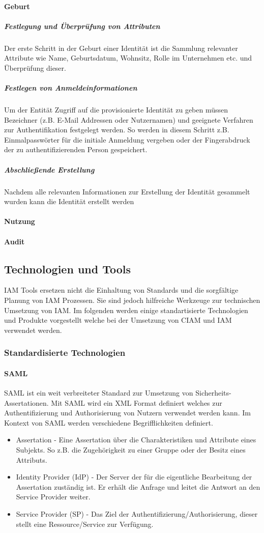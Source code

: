 \documentclass[10pt]{article}
\begin{document}
\paragraph{Geburt}
\subparagraph{Festlegung und Überprüfung von Attributen}
Der erste Schritt in der Geburt einer Identität ist die Sammlung relevanter Attribute wie Name, Geburtsdatum, Wohnsitz, Rolle im Unternehmen etc. und Überprüfung dieser.
\subparagraph{Festlegen von Anmeldeinformationen}
Um der Entität Zugriff auf die provisionierte Identität zu geben müssen Bezeichner (z.B. E-Mail Addressen oder Nutzernamen) und geeignete Verfahren zur Authentifikation festgelegt werden. So werden in diesem Schritt z.B. Einmalpasswörter für die initiale Anmeldung vergeben oder der Fingerabdruck der zu authentifizierenden Person gespeichert.
\subparagraph{Abschließende Erstellung}
Nachdem alle relevanten Informationen zur Erstellung der Identität gesammelt wurden kann die Identität erstellt werden
\paragraph{Nutzung}
\paragraph{Audit}
\subsection{Technologien und Tools}
IAM Tools ersetzen nicht die Einhaltung von Standards und die sorgfältige Planung von IAM Prozessen. Sie sind jedoch hilfreiche Werkzeuge zur technischen Umsetzung von IAM. Im folgenden werden einige standartisierte Technologien und Produkte vorgestellt welche bei der Umsetzung von CIAM und IAM verwendet werden.
\subsubsection{Standardisierte Technologien}
\paragraph{SAML}
SAML ist ein weit verbreiteter Standard zur Umsetzung von Sicherheits-Assertationen. Mit SAML wird ein XML Format definiert welches zur Authentifizierung und Authorisierung von Nutzern verwendet werden kann. Im Kontext von SAML werden verschiedene Begrifflichkeiten definiert.
\begin{itemize}
  \item Assertation - Eine Assertation über die Charakteristiken und Attribute eines Subjekts. So z.B. die Zugehörigkeit zu einer Gruppe oder der Besitz eines Attributs.
  \item Identity Provider (IdP) - Der Server der für die eigentliche Bearbeitung der Assertation zuständig ist. Er erhält die Anfrage und leitet die Antwort an den Service Provider weiter.
  \item Service Provider (SP) - Das Ziel der Authentifizierung/Authorisierung, dieser stellt eine Ressource/Service zur Verfügung.
\end{itemize}
~\cite{hughes2005security}
\end{document}
